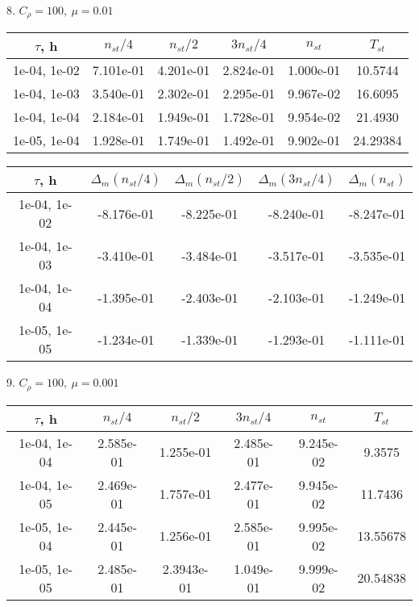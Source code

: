 8. $C_{\rho} = 100, \ \mu = 0.01$
\begin{center}
	\begin{tabular}{ |c|c|c|c|c|c| } 
		\hline
		$\tau$, h & $n_{st}/ 4$ & $n_{st}/ 2$ & $3n_{st}/ 4$ & $n_{st}$ & $T_{st}$ \\ 
		\hline
		1e-04, 1e-02 & 7.101e-01 & 4.201e-01 & 2.824e-01 & 1.000e-01 & 10.5744\\ 
		\hline
		1e-04, 1e-03 & 3.540e-01 & 2.302e-01 & 2.295e-01 & 9.967e-02 & 16.6095\\ 
		\hline
		1e-04, 1e-04 & 2.184e-01 & 1.949e-01 & 1.728e-01 & 9.954e-02 & 21.4930\\ 
		\hline
		1e-05, 1e-04 & 1.928e-01 & 1.749e-01 & 1.492e-01 & 9.902e-01 & 24.29384\\ 
		\hline
	\end{tabular}
\end{center}

\begin{center}
	\begin{tabular}{ |c|c|c|c|c| } 
		\hline
		$\tau$, h & $\Delta_m (n_{st}/ 4)$ & $\Delta_m (n_{st}/ 2)$ & $\Delta_m (3n_{st}/ 4)$ & $\Delta_m (n_{st})$ \\ 
		\hline
		1e-04, 1e-02 & -8.176e-01 & -8.225e-01 & -8.240e-01 & -8.247e-01 \\ 
		\hline
		1e-04, 1e-03 & -3.410e-01 & -3.484e-01 & -3.517e-01 & -3.535e-01 \\ 
		\hline
		1e-04, 1e-04 & -1.395e-01 & -2.403e-01 & -2.103e-01 & -1.249e-01 \\ 
		\hline
		1e-05, 1e-05 & -1.234e-01 & -1.339e-01 & -1.293e-01 & -1.111e-01 \\ 
		\hline
	\end{tabular}
\end{center}

9. $C_{\rho} = 100, \ \mu = 0.001$
\begin{center}
	\begin{tabular}{ |c|c|c|c|c|c| } 
		\hline
		$\tau$, h & $n_{st}/ 4$ & $n_{st}/ 2$ & $3n_{st}/ 4$ & $n_{st}$ & $T_{st}$ \\ 
		\hline
		1e-04, 1e-04 & 2.585e-01 & 1.255e-01 & 2.485e-01 & 9.245e-02 & 9.3575\\ 
		\hline
		1e-04, 1e-05 & 2.469e-01 & 1.757e-01 & 2.477e-01 & 9.945e-02 & 11.7436\\ 
		\hline
		1e-05, 1e-04 & 2.445e-01 & 1.256e-01 & 2.585e-01 & 9.995e-02 & 13.55678\\ 
		\hline
		1e-05, 1e-05 & 2.485e-01 & 2.3943e-01 & 1.049e-01 & 9.999e-02 & 20.54838\\ 
		\hline
	\end{tabular}
\end{center}

